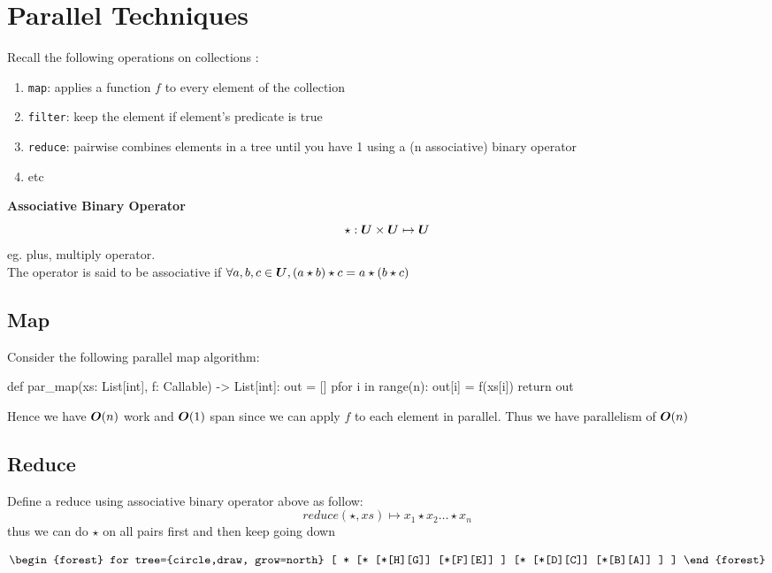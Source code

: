\documentclass[12pt]{article}
\begin{document}
\section{Parallel Techniques}
Recall the following operations on collections :
\begin{enumerate}
	\item \lstinline|map|: applies a function $f$ to every element of the collection
	\item \lstinline|filter|: keep the element if element's predicate is true
	\item \lstinline|reduce|: pairwise combines elements in a tree until you have 1 using a (n associative) binary operator 
	\item etc
\end{enumerate}

\begin{tcolorbox}
	\textbf{Associative Binary Operator}
	\[ 
	\star: {\boldsymbol U} \times {\boldsymbol U}\mapsto {\boldsymbol U}
	\]
	eg. plus, multiply operator.\\
	
	The operator is said to be associative if $\forall a,b,c \in {\boldsymbol U} , (a\star b)\star c = a\star (b\star c)$
\end{tcolorbox}

\subsection{Map}
Consider the following parallel map algorithm:

\begin{python}
def par_map(xs: List[int], f: Callable) -> List[int]:
	out = []
	pfor i in range(n):
		out[i] = f(xs[i])
	return out
\end{python}

Hence we have ${\boldsymbol O}(n)$ work and ${\boldsymbol O}(1)$ span since we can apply $f$ to each element in parallel. Thus we have parallelism of ${\boldsymbol O}(n)$ 

\subsection{Reduce}

Define a reduce using associative binary operator above as follow:
\[
reduce(\star, xs) \mapsto x_1\star x_2 \dots \star x_n
\]
thus we can do $\star$ on all pairs first and then keep going down

\begin{align}
	\begin{forest}
	for tree={circle,draw, grow=north}
	[
	*
	[*
	[*[H][G]]
	[*[F][E]]
	]
	[*
	[*[D][C]]
	[*[B][A]]
	]
	]
	\end{forest}
\end{align}
\end{document}
